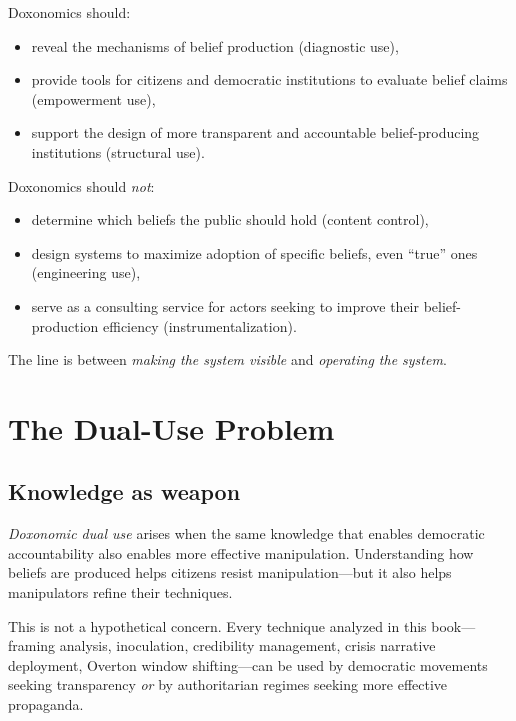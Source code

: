 \begin{principle}
\label{prin:anti-technocracy}
Doxonomics should:
\begin{itemize}[nosep]
  \item reveal the mechanisms of belief production (diagnostic use),
  \item provide tools for citizens and democratic institutions to evaluate belief claims (empowerment use),
  \item support the design of more transparent and accountable belief-producing institutions (structural use).
\end{itemize}
Doxonomics should \emph{not}:
\begin{itemize}[nosep]
  \item determine which beliefs the public should hold (content control),
  \item design systems to maximize adoption of specific beliefs, even ``true'' ones (engineering use),
  \item serve as a consulting service for actors seeking to improve their belief-production efficiency (instrumentalization).
\end{itemize}
The line is between \emph{making the system visible} and \emph{operating the system}.
\end{principle}

\section{The Dual-Use Problem}
\label{sec:ch34-dual-use}

\subsection{Knowledge as weapon}

\begin{definition}
\label{def:dual-use}
\emph{Doxonomic dual use} arises when the same knowledge that enables democratic accountability also enables more effective manipulation.
Understanding how beliefs are produced helps citizens resist manipulation---but it also helps manipulators refine their techniques.
\end{definition}

This is not a hypothetical concern.
Every technique analyzed in this book---framing analysis, inoculation, credibility management, crisis narrative deployment, Overton window shifting---can be used by democratic movements seeking transparency \emph{or} by authoritarian regimes seeking more effective propaganda.

